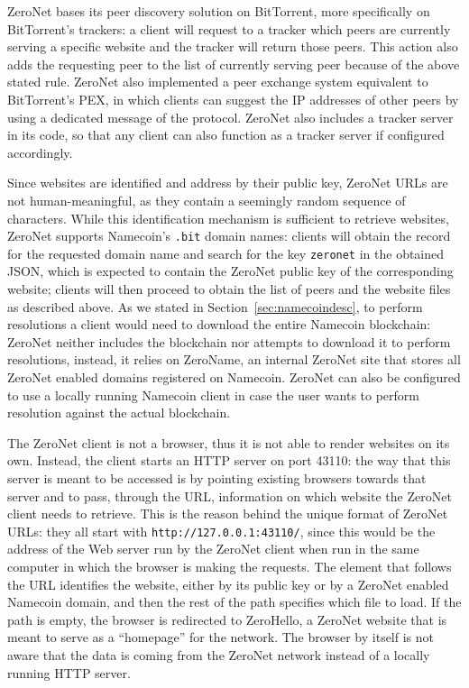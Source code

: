 \documentclass[mscthesis]{usiinfthesis}
\begin{document}
ZeroNet bases its peer discovery solution on BitTorrent, more specifically on BitTorrent's trackers: a client will request to a tracker which peers are currently serving a specific website and the tracker will return those peers. This action also adds the requesting peer to the list of currently serving peer because of the above stated rule. ZeroNet also implemented a peer exchange system equivalent to BitTorrent's PEX, in which clients can suggest the IP addresses of other peers by using a dedicated message of the protocol. ZeroNet also includes a tracker server in its code, so that any client can also function as a tracker server if configured accordingly.

Since websites are identified and address by their public key, ZeroNet URLs are not human-meaningful, as they contain a seemingly random sequence of characters. While this identification mechanism is sufficient to retrieve websites, ZeroNet supports Namecoin's \texttt{.bit} domain names: clients will obtain the record for the requested domain name and search for the key \texttt{zeronet} in the obtained JSON, which is expected to contain the ZeroNet public key of the corresponding website; clients will then proceed to obtain the list of peers and the website files as described above. As we stated in Section~\ref{sec:namecoindesc}, to perform resolutions a client would need to download the entire Namecoin blockchain: ZeroNet neither includes the blockchain nor attempts to download it to perform resolutions, instead, it relies on ZeroName, an internal ZeroNet site that stores all ZeroNet enabled domains registered on Namecoin. ZeroNet can also be configured to use a locally running Namecoin client in case the user wants to perform resolution against the actual blockchain.

The ZeroNet client is not a browser, thus it is not able to render websites on its own. Instead, the client starts an HTTP server on port 43110: the way that this server is meant to be accessed is by pointing existing browsers towards that server and to pass, through the URL, information on which website the ZeroNet client needs to retrieve. This is the reason behind the unique format of ZeroNet URLs: they all start with \texttt{http://127.0.0.1:43110/}, since this would be the address of the Web server run by the ZeroNet client when run in the same computer in which the browser is making the requests. The element that follows the URL identifies the website, either by its public key or by a ZeroNet enabled Namecoin domain, and then the rest of the path specifies which file to load. If the path is empty, the browser is redirected to ZeroHello, a ZeroNet website that is meant to serve as a ``homepage'' for the network. The browser by itself is not aware that the data is coming from the ZeroNet network instead of a locally running HTTP server.
\end{document}
